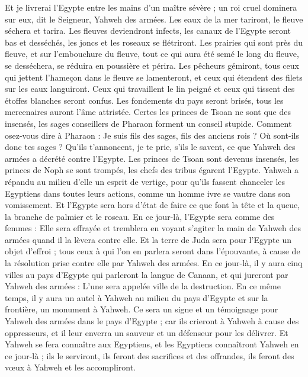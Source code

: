 \begin{multicols}{2}
Et je livrerai l'Egypte entre les mains d'un maître sévère ; un roi cruel dominera sur eux, dit le Seigneur, Yahweh des armées.
Les eaux de la mer tariront, le fleuve séchera et tarira.
Les fleuves deviendront infects, les canaux de l'Egypte seront bas et desséchés, les joncs et les roseaux se flétriront.
Les prairies qui sont près du fleuve, et sur l'embouchure du fleuve, tout ce qui aura été semé le long du fleuve, se desséchera, se réduira en poussière et périra.
Les pêcheurs gémiront, tous ceux qui jettent l'hameçon dans le fleuve se lamenteront, et ceux qui étendent des filets sur les eaux languiront.
Ceux qui travaillent le lin peigné et ceux qui tissent des étoffes blanches seront confus.
Les fondements du pays seront brisés, tous les mercenaires auront l'âme attristée.
Certes les princes de Tsoan ne sont que des insensés, les sages conseillers de Pharaon forment un conseil stupide. Comment osez-vous dire à Pharaon : Je suis fils des sages, fils des anciens rois ?
Où sont-ils donc tes sages ? Qu'ils t'annoncent, je te prie, s'ils le savent, ce que Yahweh des armées a décrété contre l'Egypte.
Les princes de Tsoan sont devenus insensés, les princes de Noph se sont trompés, les chefs des tribus égarent l'Egypte.
Yahweh a répandu au milieu d'elle un esprit de vertige, pour qu'ils fassent chanceler les Egyptiens dans toutes leurs actions, comme un homme ivre se vautre dans son vomissement.
Et l'Egypte sera hors d'état de faire ce que font la tête et la queue, la branche de palmier et le roseau.
En ce jour-là, l'Egypte sera comme des femmes : Elle sera effrayée et tremblera en voyant s'agiter la main de Yahweh des armées quand il la lèvera contre elle.
Et la terre de Juda sera pour l'Egypte un objet d'effroi ; tous ceux à qui l'on en parlera seront dans l'épouvante, à cause de la résolution prise contre elle par Yahweh des armées.
En ce jour-là, il y aura cinq villes au pays d'Egypte qui parleront la langue de Canaan, et qui jureront par Yahweh des armées : L'une sera appelée ville de la destruction.
En ce même temps, il y aura un autel à Yahweh au milieu du pays d'Egypte et sur la frontière, un monument à Yahweh.
Ce sera un signe et un témoignage pour Yahweh des armées dans le pays d'Egypte ; car ils crieront à Yahweh à cause des oppresseurs, et il leur enverra un sauveur et un défenseur pour les délivrer.
Et Yahweh se fera connaître aux Egyptiens, et les Egyptiens connaîtront Yahweh en ce jour-là ; ils le serviront, ils feront des sacrifices et des offrandes, ils feront des vœux à Yahweh et les accompliront.

\end{multicols}
